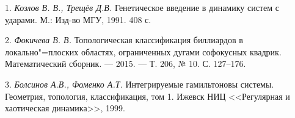 \litlist

1. {\it  Козлов В. В., Трещёв Д.В.} Генетическое введение в динамику систем с ударами. М.:  Изд-во МГУ, 1991. 408 с.

2. {\it Фокичева В. В.} Топологическая классификация биллиардов в локально"=плоских областях, ограниченных дугами софокусных квадрик. Математический сборник. — 2015. — Т. 206, № 10. С. 127–176.

3. {\it Болсинов А.В., Фоменко А.Т.} Интегрируемые гамильтоновы системы. Геометрия, топология, классификация, том 1. Ижевск НИЦ <<Регулярная и хаотическая динамика>>, 1999.

